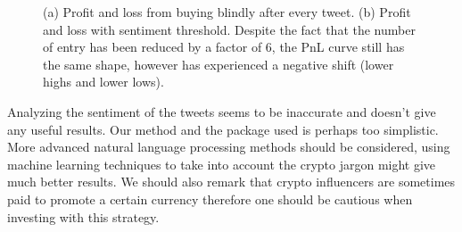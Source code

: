 \documentclass[twoside]{report}
\begin{document}
\begin{spacing}{1}
\begin{figure}[!h]
\begin{minipage}{.5\linewidth}
\end{minipage}\par\medskip
\centering
\caption{(a) Profit and loss from buying blindly after every tweet. (b) Profit and loss with sentiment threshold. Despite the fact that the number of entry has been reduced by a factor of 6, the PnL curve still has the same shape, however has experienced a negative shift (lower highs and lower lows).}
\label{fig:pnl_naji102}
\end{figure}

Analyzing the sentiment of the tweets seems to be inaccurate and doesn't give any useful results. Our method and the package used is perhaps too simplistic. More advanced natural language processing methods should be considered, using machine learning techniques to take into account the crypto jargon might give much better results. We should also remark that crypto influencers are sometimes paid to promote a certain currency therefore one should be cautious when investing with this strategy. 




\end{spacing}
\end{document}

